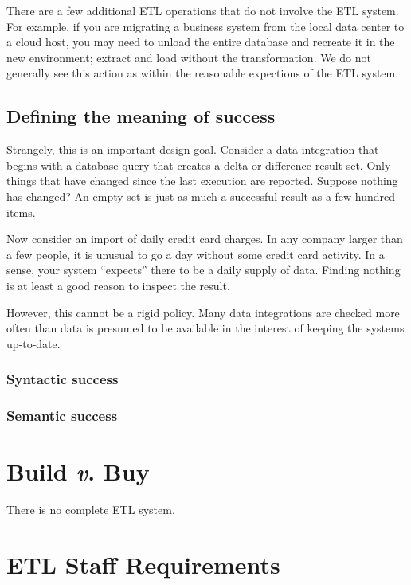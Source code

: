 \documentclass[11pt,letterpaper,twosided]{memoir}
\begin{document}
There are a few additional ETL operations that do not involve
the ETL system. For example, if you are migrating a business system
from the local data center to a cloud host, you may need to unload
the entire database and recreate it in the new environment; extract
and load without the transformation. We do not generally see this
action as within the reasonable expections of the ETL system.

\section{Defining the meaning of success}
\label{sec:success}

Strangely, this is an important design goal. Consider a data
integration that begins with a database query that creates a delta
or difference result set. Only things that have changed since the
last execution are reported. Suppose nothing has changed? An empty
set is just as much a successful result as a few hundred items.

Now consider an import of daily credit card charges. In any company 
larger than a few people, it is unusual to go a day without some
credit card activity. In a sense, your system ``expects'' there to
be a daily supply of data. Finding nothing is at least a good
reason to inspect the result.

However, this cannot be a rigid policy. Many data integrations
are checked more often than data is presumed to be available in
the interest of keeping the systems up-to-date. 

\subsection{Syntactic success}

\subsection{Semantic success}



\chapter{Build \emph{v}. Buy}
\label{chap:buildvbuy}

There is no complete ETL system.

\chapter{ETL Staff Requirements}
\label{chap:staffing}
\end{document}

